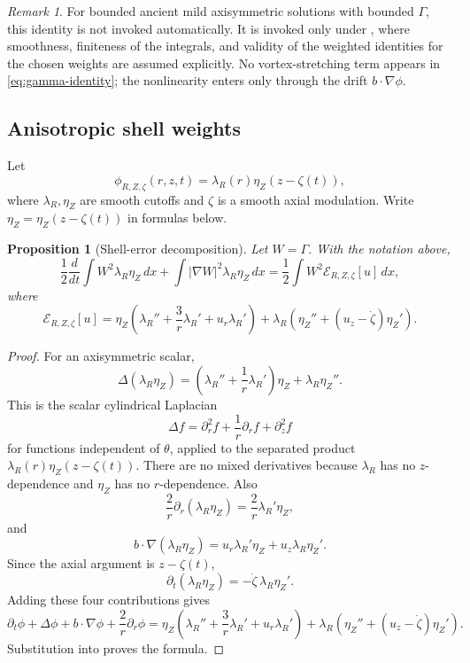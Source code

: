 \documentclass[11pt]{amsart}
\theoremstyle{plain}
\newtheorem{proposition}[theorem]{Proposition}
\theoremstyle{definition}
\theoremstyle{remark}
\newtheorem{remark}[theorem]{Remark}
\numberwithin{equation}{section}
\begin{document}
\begin{remark}
For bounded ancient mild axisymmetric solutions with bounded \(\Gamma\), this
identity is not invoked automatically.  It is invoked only under
, where smoothness, finiteness of the integrals, and
validity of the weighted identities for the chosen weights are assumed
explicitly.  No vortex-stretching term appears in \eqref{eq:gamma-identity};
the nonlinearity enters only through the drift \(b\cdot\nabla\phi\).
\end{remark}

\subsection{Anisotropic shell weights}

Let
\[
   \phi_{R,Z,\zeta}(r,z,t)=\lambda_R(r)\eta_Z(z-\zeta(t)),
\]
where \(\lambda_R,\eta_Z\) are smooth cutoffs and \(\zeta\) is a smooth axial
modulation.  Write \(\eta_Z=\eta_Z(z-\zeta(t))\) in formulas below.

\begin{proposition}[Shell-error decomposition]\label{prop:shell}
Let \(W=\Gamma\).  With the notation above,
\begin{equation}\label{eq:shell-identity}
   \frac12\frac{d}{dt}\int W^2\lambda_R\eta_Z\,dx
   +
   \int|\nabla W|^2\lambda_R\eta_Z\,dx
   =
   \frac12\int W^2\mathcal E_{R,Z,\zeta}[u]\,dx,
\end{equation}
where
\begin{equation}\label{eq:shell-error}
   \mathcal E_{R,Z,\zeta}[u]
   =
   \eta_Z\left(
      \lambda_R''+\frac3r\lambda_R'+u_r\lambda_R'
   \right)
   +
   \lambda_R\left(
      \eta_Z''+(u_z-\dot\zeta)\eta_Z'
   \right).
\end{equation}
\end{proposition}

\begin{proof}
For an axisymmetric scalar,
\[
   \Delta(\lambda_R\eta_Z)
   =
   \left(\lambda_R''+\frac1r\lambda_R'\right)\eta_Z
   +
   \lambda_R\eta_Z'' .
\]
This is the scalar cylindrical Laplacian
\[
   \Delta f=\partial_r^2f+\frac1r\partial_rf+\partial_z^2f
\]
for functions independent of \(\theta\), applied to the separated product
\(\lambda_R(r)\eta_Z(z-\zeta(t))\).  There are no mixed derivatives because
\(\lambda_R\) has no \(z\)-dependence and \(\eta_Z\) has no \(r\)-dependence.
Also
\[
   \frac2r\partial_r(\lambda_R\eta_Z)
   =
   \frac2r\lambda_R'\eta_Z ,
\]
and
\[
   b\cdot\nabla(\lambda_R\eta_Z)
   =
   u_r\lambda_R'\eta_Z+u_z\lambda_R\eta_Z' .
\]
Since the axial argument is \(z-\zeta(t)\),
\[
   \partial_t(\lambda_R\eta_Z)=-\dot\zeta\,\lambda_R\eta_Z' .
\]
Adding these four contributions gives
\[
   \partial_t\phi+\Delta\phi+b\cdot\nabla\phi+\frac2r\partial_r\phi
   =
   \eta_Z\left(\lambda_R''+\frac3r\lambda_R'+u_r\lambda_R'\right)
   +
   \lambda_R\left(\eta_Z''+(u_z-\dot\zeta)\eta_Z'\right).
\]
Substitution into  proves the formula.
\end{proof}
\end{document}
